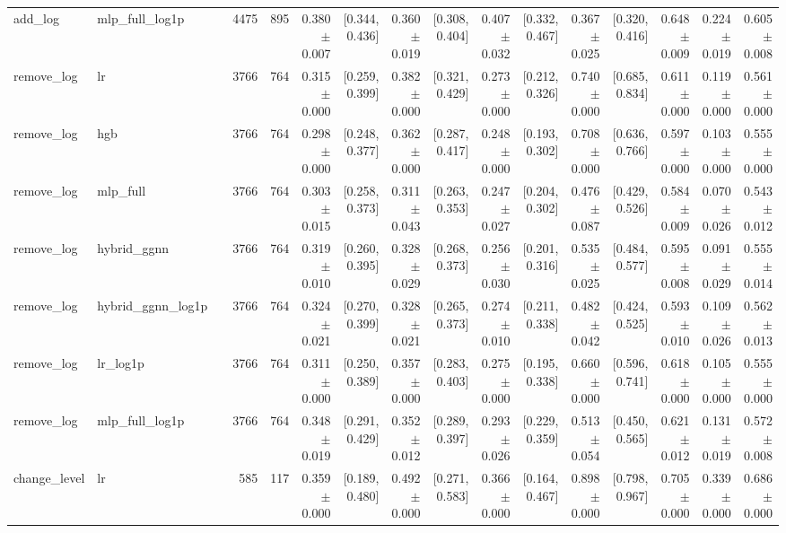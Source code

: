 \begin{table}[htbp]
{\begin{tabular}{llrrrrrrrrrrrrrr}
add\_log & mlp\_full\_log1p &  & 4475 & 895 & 0.380 $\pm$ 0.007 & [0.344, 0.436] & 0.360 $\pm$ 0.019 & [0.308, 0.404] & 0.407 $\pm$ 0.032 & [0.332, 0.467] & 0.367 $\pm$ 0.025 & [0.320, 0.416] & 0.648 $\pm$ 0.009 & 0.224 $\pm$ 0.019 & 0.605 $\pm$ 0.008 \\
remove\_log & lr &  & 3766 & 764 & 0.315 $\pm$ 0.000 & [0.259, 0.399] & 0.382 $\pm$ 0.000 & [0.321, 0.429] & 0.273 $\pm$ 0.000 & [0.212, 0.326] & 0.740 $\pm$ 0.000 & [0.685, 0.834] & 0.611 $\pm$ 0.000 & 0.119 $\pm$ 0.000 & 0.561 $\pm$ 0.000 \\
remove\_log & hgb &  & 3766 & 764 & 0.298 $\pm$ 0.000 & [0.248, 0.377] & 0.362 $\pm$ 0.000 & [0.287, 0.417] & 0.248 $\pm$ 0.000 & [0.193, 0.302] & 0.708 $\pm$ 0.000 & [0.636, 0.766] & 0.597 $\pm$ 0.000 & 0.103 $\pm$ 0.000 & 0.555 $\pm$ 0.000 \\
remove\_log & mlp\_full &  & 3766 & 764 & 0.303 $\pm$ 0.015 & [0.258, 0.373] & 0.311 $\pm$ 0.043 & [0.263, 0.353] & 0.247 $\pm$ 0.027 & [0.204, 0.302] & 0.476 $\pm$ 0.087 & [0.429, 0.526] & 0.584 $\pm$ 0.009 & 0.070 $\pm$ 0.026 & 0.543 $\pm$ 0.012 \\
remove\_log & hybrid\_ggnn &  & 3766 & 764 & 0.319 $\pm$ 0.010 & [0.260, 0.395] & 0.328 $\pm$ 0.029 & [0.268, 0.373] & 0.256 $\pm$ 0.030 & [0.201, 0.316] & 0.535 $\pm$ 0.025 & [0.484, 0.577] & 0.595 $\pm$ 0.008 & 0.091 $\pm$ 0.029 & 0.555 $\pm$ 0.014 \\
remove\_log & hybrid\_ggnn\_log1p &  & 3766 & 764 & 0.324 $\pm$ 0.021 & [0.270, 0.399] & 0.328 $\pm$ 0.021 & [0.265, 0.373] & 0.274 $\pm$ 0.010 & [0.211, 0.338] & 0.482 $\pm$ 0.042 & [0.424, 0.525] & 0.593 $\pm$ 0.010 & 0.109 $\pm$ 0.026 & 0.562 $\pm$ 0.013 \\
remove\_log & lr\_log1p &  & 3766 & 764 & 0.311 $\pm$ 0.000 & [0.250, 0.389] & 0.357 $\pm$ 0.000 & [0.283, 0.403] & 0.275 $\pm$ 0.000 & [0.195, 0.338] & 0.660 $\pm$ 0.000 & [0.596, 0.741] & 0.618 $\pm$ 0.000 & 0.105 $\pm$ 0.000 & 0.555 $\pm$ 0.000 \\
remove\_log & mlp\_full\_log1p &  & 3766 & 764 & 0.348 $\pm$ 0.019 & [0.291, 0.429] & 0.352 $\pm$ 0.012 & [0.289, 0.397] & 0.293 $\pm$ 0.026 & [0.229, 0.359] & 0.513 $\pm$ 0.054 & [0.450, 0.565] & 0.621 $\pm$ 0.012 & 0.131 $\pm$ 0.019 & 0.572 $\pm$ 0.008 \\
change\_level & lr &  & 585 & 117 & 0.359 $\pm$ 0.000 & [0.189, 0.480] & 0.492 $\pm$ 0.000 & [0.271, 0.583] & 0.366 $\pm$ 0.000 & [0.164, 0.467] & 0.898 $\pm$ 0.000 & [0.798, 0.967] & 0.705 $\pm$ 0.000 & 0.339 $\pm$ 0.000 & 0.686 $\pm$ 0.000 \\

\end{tabular}}
\end{table}
